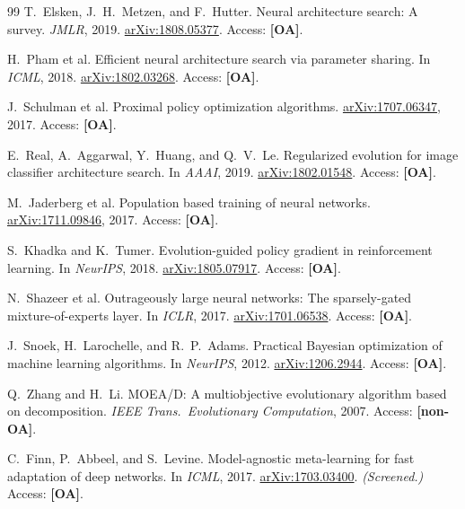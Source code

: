 \documentclass[10pt,twocolumn,letterpaper]{article}
\begin{document}
{\begin{thebibliography}{99}
T.~Elsken, J.~H.~Metzen, and F.~Hutter.
\newblock Neural architecture search: A survey.
\newblock \emph{JMLR}, 2019.
\newblock \href{https://arxiv.org/abs/1808.05377}{arXiv:1808.05377}.
\newblock Access: \textbf{[OA]}.

H.~Pham et al.
\newblock Efficient neural architecture search via parameter sharing.
\newblock In \emph{ICML}, 2018.
\newblock \href{https://arxiv.org/abs/1802.03268}{arXiv:1802.03268}.
\newblock Access: \textbf{[OA]}.

J.~Schulman et al.
\newblock Proximal policy optimization algorithms.
\newblock \href{https://arxiv.org/abs/1707.06347}{arXiv:1707.06347}, 2017.
\newblock Access: \textbf{[OA]}.

E.~Real, A.~Aggarwal, Y.~Huang, and Q.~V.~Le.
\newblock Regularized evolution for image classifier architecture search.
\newblock In \emph{AAAI}, 2019.
\newblock \href{https://arxiv.org/abs/1802.01548}{arXiv:1802.01548}.
\newblock Access: \textbf{[OA]}.

M.~Jaderberg et al.
\newblock Population based training of neural networks.
\newblock \href{https://arxiv.org/abs/1711.09846}{arXiv:1711.09846}, 2017.
\newblock Access: \textbf{[OA]}.

S.~Khadka and K.~Tumer.
\newblock Evolution-guided policy gradient in reinforcement learning.
\newblock In \emph{NeurIPS}, 2018.
\newblock \href{https://arxiv.org/abs/1805.07917}{arXiv:1805.07917}.
\newblock Access: \textbf{[OA]}.

N.~Shazeer et al.
\newblock Outrageously large neural networks: The sparsely-gated mixture-of-experts layer.
\newblock In \emph{ICLR}, 2017.
\newblock \href{https://arxiv.org/abs/1701.06538}{arXiv:1701.06538}.
\newblock Access: \textbf{[OA]}.

J.~Snoek, H.~Larochelle, and R.~P.~Adams.
\newblock Practical Bayesian optimization of machine learning algorithms.
\newblock In \emph{NeurIPS}, 2012.
\newblock \href{https://arxiv.org/abs/1206.2944}{arXiv:1206.2944}.
\newblock Access: \textbf{[OA]}.

Q.~Zhang and H.~Li.
\newblock MOEA/D: A multiobjective evolutionary algorithm based on decomposition.
\newblock \emph{IEEE Trans.\ Evolutionary Computation}, 2007.
\newblock Access: \textbf{[non-OA]}.

C.~Finn, P.~Abbeel, and S.~Levine.
\newblock Model-agnostic meta-learning for fast adaptation of deep networks.
\newblock In \emph{ICML}, 2017.
\newblock \href{https://arxiv.org/abs/1703.03400}{arXiv:1703.03400}. \textit{(Screened.)}
\newblock Access: \textbf{[OA]}.


\end{thebibliography}}
\end{document}

